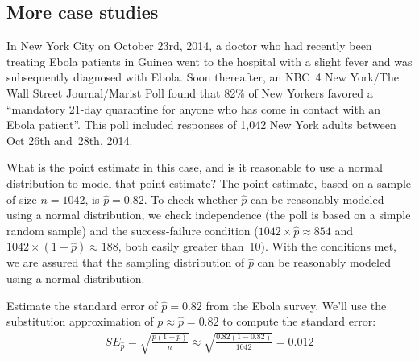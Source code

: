 \subsection{More case studies}


\newcommand{\wsjebolapollsize}{1042}
\newcommand{\wsjebolapollsizecomma}{1,042}
\newcommand{\wsjebolapollprop}{0.82}
\newcommand{\wsjebolapollpropcomplement}{0.18}
\newcommand{\wsjebolapollpercent}{82}
\newcommand{\wsjebolapollpercentcomplement}{18}
\newcommand{\wsjebolapollcount}{854}
\newcommand{\wsjebolapollcountcomplement}{188}
\newcommand{\wsjebolapollse}{0.012}


In New York City on October 23rd, 2014, a doctor who had recently been
treating Ebola patients in Guinea went to the hospital with a slight fever
and was subsequently diagnosed with Ebola. Soon thereafter,
an NBC~4 New York/The Wall Street Journal/Marist Poll found that
\wsjebolapollpercent{}\% of New Yorkers favored a ``mandatory 21-day
quarantine for anyone who has come in contact with an Ebola
patient''. This poll included responses
of \wsjebolapollsizecomma{} New York adults between
Oct 26th and~28th, 2014.

\begin{examplewrap}
\begin{nexample}{What is the point estimate in this case,
    and is it reasonable to
    use a normal distribution to model that point estimate?}
  The point estimate, based on a sample of size $n = \wsjebolapollsize{}$,
  is $\hat{p} = \wsjebolapollprop{}$.
  To check whether $\hat{p}$ can be reasonably
  modeled using a normal distribution, we check independence
  (the poll is based on a simple random sample) and the
  success-failure condition
  ($\wsjebolapollsize{} \times \hat{p} \approx \wsjebolapollcount{}$
  and $\wsjebolapollsize{} \times (1 - \hat{p})
      \approx \wsjebolapollcountcomplement{}$,
  both easily greater than~10).
  With the conditions met, we are assured
  that the sampling distribution of $\hat{p}$ can be
  reasonably modeled using a normal distribution.
\end{nexample}
\end{examplewrap}

\begin{examplewrap}
\begin{nexample}{Estimate the standard error of
    $\hat{p} = \wsjebolapollprop{}$ from the Ebola survey.}
  \label{seOfPropOfNYEbolaSurvey}%
  We'll use the substitution approximation of
  $p \approx \hat{p} = \wsjebolapollprop{}$ to compute
  the standard error:
  \begin{align*}
  SE_{\hat{p}}
    = \sqrt{\frac{p(1-p)}{n}}
    \approx \sqrt{\frac{\wsjebolapollprop{}
        (1 - \wsjebolapollprop{})}{\wsjebolapollsize{}}}
    = \wsjebolapollse{}
  \end{align*}
\end{nexample}
\end{examplewrap}

